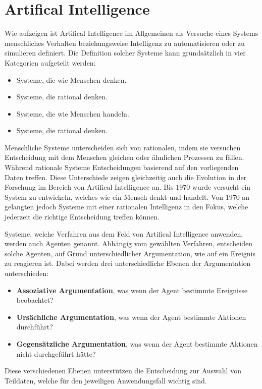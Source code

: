 

\section{Artifical Intelligence}


Wie \cite{Russell:2009:AIM:1671238} aufzeigen ist \gls{Artifical Intelligence} im Allgemeinen als Versuche eines Systems menschliches Verhalten beziehungsweise Intelligenz zu automatisieren oder zu simulieren definiert. Die Definition solcher Systeme kann grundsätzlich in vier Kategorien aufgeteilt werden: 

\begin{itemize}
    \item Systeme, die wie Menschen denken.
    \item Systeme, die rational denken.
    \item Systeme, die wie Menschen handeln.
    \item Systeme, die rational denken.
\end{itemize}

Menschliche Systeme unterscheiden sich von rationalen, indem sie versuchen Entscheidung mit dem Menschen gleichen oder ähnlichen Prozessen zu fällen. Während rationale Systeme Entscheidungen basierend auf den vorliegenden Daten treffen. Diese Unterschiede zeigen gleichzeitig auch die Evolution in der Forschung im Bereich von \gls{Artifical Intelligence} an. Bis 1970 wurde versucht ein System zu entwickeln, welches wie ein Mensch denkt und handelt. Von 1970 an gelangten jedoch Systeme mit einer rationalen Intelligenz in den Fokus, welche jederzeit die richtige Entscheidung treffen können.


Systeme, welche Verfahren aus dem Feld von \gls{Artifical Intelligence} anwenden, werden auch Agenten genannt. Abhängig vom gewählten Verfahren, entscheiden solche Agenten, auf Grund unterschiedlicher Argumentation, wie auf ein Ereignis zu reagieren ist. Dabei werden drei unterschiedliche Ebenen der Argumentation unterschieden:
\begin{itemize}
    \item \textbf{Assoziative Argumentation}, was wenn der Agent bestimmte Ereignisse beobachtet?
    \item \textbf{Ursächliche Argumentation}, was wenn der Agent bestimmte Aktionen durchführt?
    \item \textbf{Gegensätzliche Argumentation}, was wenn der Agent bestimmte Aktionen nicht durchgeführt hätte?
\end{itemize}
Diese verschiedenen Ebenen unterstützen die Entscheidung zur Auswahl von Teildaten, welche für den jeweiligen Anwendungsfall wichtig sind.

